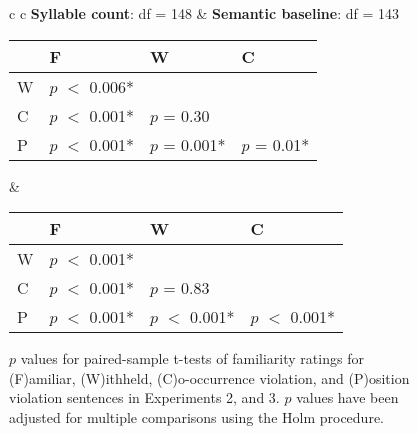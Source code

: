 \begin{figure}[h]
\begin{center}
\begin{tabular}{ c c}
      \textbf{Syllable count}: df = 148 & \textbf{Semantic baseline}: df = 143 \\




      {
      \small
      \begin{tabular}{| l | l |  l | l |}
        \hline
        & F                           & W                         & C \\
        \hline
        W &  $p$ $<$ 0.006*  &                           &\\
        \hline
        C &  $p$ $<$ 0.001*  &  $p$ = 0.30  &\\
        \hline
        P &  $p$ $<$ 0.001* &  $p$ = 0.001*  &  $p$ = 0.01*\\
        \hline
      \end{tabular}
      } &




          {
          \small
          \begin{tabular}{| l | l |  l | l |}
            \hline
            & F                            & W                         & C \\
            \hline
            W &  $p$ $<$ 0.001*  &                           &\\
            \hline
            C &  $p$ $<$ 0.001*  &  $p$ = 0.83   &\\
            \hline
            P &  $p$ $<$ 0.001* &  $p$ $<$ 0.001*  &  $p$ $<$ 0.001*\\
            \hline
          \end{tabular}
      }

    \end{tabular}
    \caption{$p$ values for paired-sample t-tests of familiarity ratings for (F)amiliar, (W)ithheld, (C)o-occurrence violation, and (P)osition violation sentences in Experiments 2, and 3. $p$ values have been adjusted for multiple comparisons using the Holm procedure.}
    \label{familiarity-ordering-t-tests-23}
  \end{center}
\end{figure}